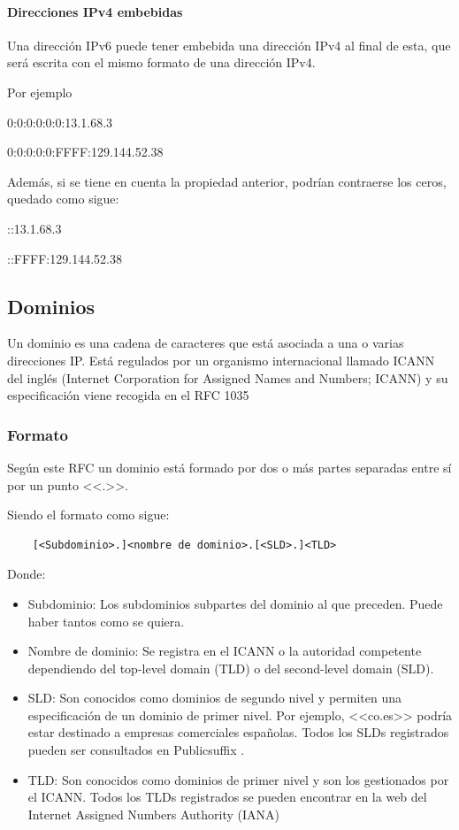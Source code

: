 \paragraph{Direcciones IPv4 embebidas}\label{subsec:ipv6}
Una dirección IPv6 puede tener embebida una dirección IPv4 al final de esta, que será escrita con el mismo formato de una dirección IPv4. 

Por ejemplo 

    0:0:0:0:0:0:13.1.68.3

    0:0:0:0:0:FFFF:129.144.52.38
    
Además, si se tiene en cuenta la propiedad anterior, podrían contraerse los ceros, quedado como sigue: 

    ::13.1.68.3

    ::FFFF:129.144.52.38

\subsection{Dominios}\label{subsec:Dominios}
Un dominio es una cadena de caracteres que está asociada a una o varias direcciones IP. Está regulados por un organismo internacional llamado ICANN del inglés (Internet Corporation for Assigned Names and Numbers; ICANN) \cite{icann} y su especificación viene recogida en el RFC 1035 \cite{rfc1035}

\subsubsection{Formato}
Según este RFC un dominio está formado por dos o más partes separadas entre sí por un punto <<.>>. 

Siendo el formato como sigue: 
\begin{verbatim}
    [<Subdominio>.]<nombre de dominio>.[<SLD>.]<TLD>
\end{verbatim}

Donde: 
\begin{itemize}
    \item Subdominio: Los subdominios subpartes del dominio al que preceden. Puede haber tantos como se quiera.
    \item Nombre de dominio: Se registra en el ICANN o la autoridad competente dependiendo del top-level domain (TLD) o del second-level domain (SLD).
    \item SLD: Son conocidos como dominios de segundo nivel y permiten una especificación de un dominio de primer nivel. Por ejemplo, <<co.es>> podría estar destinado a empresas comerciales españolas. Todos los SLDs registrados pueden ser consultados en Publicsuffix \cite{SLD_list}.
    \item TLD: Son conocidos como dominios de primer nivel y son los gestionados por el ICANN. Todos los TLDs registrados se pueden encontrar en la web del Internet Assigned Numbers Authority (IANA) \cite{TLD_list}
\end{itemize}

